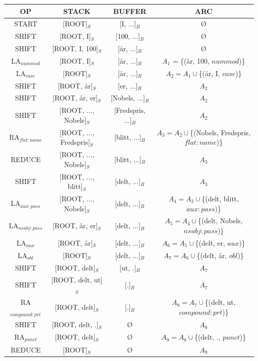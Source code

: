 \documentclass{article}
\begin{document}
\begin{centering}
\begin{tabular}{ |c|c|c|c| }
\hline
OP &STACK & BUFFER & ARC \\
\hline
START & [ROOT]$_S$ & [I, ...]$_B$ & $Ø$ \\
\hline
SHIFT & [ROOT, I]$_S$ & [100, ...]$_B$ & $Ø$ \\
\hline
SHIFT & [ROOT, I, 100]$_S$ & [år, ...]$_B$ & $Ø$ \\
\hline
LA$_{nummod}$ & [ROOT, I]$_S$ & [år, ...]$_B$ & $A_1$ = \{(år, 100, $nummod$)\} \\
\hline
LA$_{case}$ & [ROOT]$_S$ & [år, ...]$_B$ & $A_2 = A_1 \cup$\{(år, I, $case$)\} \\
\hline
SHIFT & [ROOT, år]$_S$ & [er, ...]$_B$ & $A_2$ \\
\hline
SHIFT & [ROOT, år, er]$_S$ & [Nobels, ...]$_B$ & $A_2$ \\
\hline
SHIFT & [ROOT, ..., Nobels]$_S$ & [Fredspris, ...]$_B$ & $A_2$ \\
\hline
RA$_{flat:name}$ & [ROOT, ..., Fredspris]$_S$ & [blitt, ...]$_B$ & $A_3 = A_2\cup$\{(Nobels, Fredspris, $flat:name$)\} \\
\hline
REDUCE & [ROOT, ..., Nobels]$_S$ & [blitt, ...]$_B$ & $A_3$ \\
\hline
SHIFT & [ROOT, ..., blitt]$_S$ & [delt, ...]$_B$ & $A_3$ \\
\hline
LA$_{aux:pass}$ & [ROOT, ..., Nobels]$_S$ & [delt, ...]$_B$ & $A_4 = A_3\cup$\{(delt, blitt, $aux:pass$)\} \\
\hline
LA$_{nsubj:pass}$ & [ROOT, år, er]$_S$ & [delt, ...]$_B$ & $A_5 = A_4\cup$\{(delt, Nobels, $nsubj:pass$)\} \\
\hline
LA$_{aux}$ & [ROOT, år]$_S$ & [delt, ...]$_B$ & $A_6 = A_5\cup$\{(delt, er, $aux$)\} \\
\hline
LA$_{obl}$ & [ROOT]$_S$ & [delt, ...]$_B$ & $A_7 = A_6\cup$\{(delt, år, $obl$)\} \\
\hline
SHIFT & [ROOT, delt]$_S$ & [ut, .]$_B$ & $A_7$ \\
\hline
SHIFT & [ROOT, delt, ut]$_S$ & [.]$_B$ & $A_7$ \\
\hline
RA$_{compound:prt}$ & [ROOT, delt]$_S$ & [.]$_B$ & $A_8 = A_7\cup$\{(delt, ut, $compound:prt$)\} \\
\hline
SHIFT & [ROOT, delt, .]$_S$ & $Ø$ & $A_8$ \\
\hline
RA$_{punct}$ & [ROOT, delt]$_S$ & $Ø$ & $A_9 = A_8\cup$\{(delt, ., $punct$)\} \\
\hline
REDUCE & [ROOT]$_S$ & $Ø$ & $A_9$ \\
\hline
\end{tabular}
\end{centering}
\end{document}

